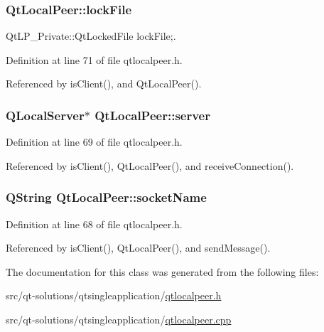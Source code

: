 \hypertarget{class_qt_local_peer_ab72488160eed35c9518ef3de1e6062cf}{
\subsubsection[{lock\-File}]{ Qt\-Local\-Peer\-::lock\-File\hspace{0.3cm}{\ttfamily [protected]}}}\label{class_qt_local_peer_ab72488160eed35c9518ef3de1e6062cf}


Qt\-L\-P\-\_\-\-Private\-::\-Qt\-Locked\-File lock\-File;. 



Definition at line 71 of file qtlocalpeer.\-h.



Referenced by is\-Client(), and Qt\-Local\-Peer().

\hypertarget{class_qt_local_peer_af400ab8eb001ef4790541069a5d0e292}{
\subsubsection[{server}]{\setlength{\rightskip}{0pt plus 5cm}Q\-Local\-Server$\ast$ Qt\-Local\-Peer\-::server\hspace{0.3cm}{\ttfamily [protected]}}}\label{class_qt_local_peer_af400ab8eb001ef4790541069a5d0e292}


Definition at line 69 of file qtlocalpeer.\-h.



Referenced by is\-Client(), Qt\-Local\-Peer(), and receive\-Connection().

\hypertarget{class_qt_local_peer_a2c86a18c237bdfe4bd0565d3cc413cd8}{
\subsubsection[{socket\-Name}]{\setlength{\rightskip}{0pt plus 5cm}Q\-String Qt\-Local\-Peer\-::socket\-Name\hspace{0.3cm}{\ttfamily [protected]}}}\label{class_qt_local_peer_a2c86a18c237bdfe4bd0565d3cc413cd8}


Definition at line 68 of file qtlocalpeer.\-h.



Referenced by is\-Client(), Qt\-Local\-Peer(), and send\-Message().



The documentation for this class was generated from the following files\-:\begin{DoxyCompactItemize}
\item 
src/qt-\/solutions/qtsingleapplication/\hyperlink{qtlocalpeer_8h}{qtlocalpeer.\-h}\item 
src/qt-\/solutions/qtsingleapplication/\hyperlink{qtlocalpeer_8cpp}{qtlocalpeer.\-cpp}\end{DoxyCompactItemize}
